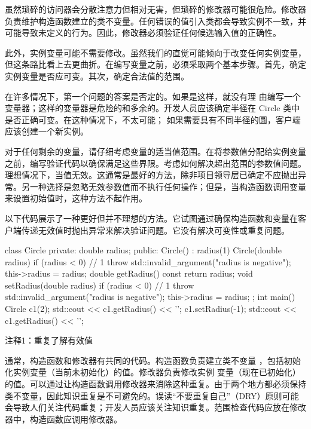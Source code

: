 虽然琐碎的访问器会分散注意力但相对无害，但琐碎的修改器可能很危险。修改器负责维护构造函数建立的类不变量。任何错误的值引入类都会导致实例不一致，并可能导致未定义的行为。因此，修改器必须验证任何候选输入值的正确性。

此外，实例变量可能不需要修改。虽然我们的直觉可能倾向于改变任何实例变量，但这条路比看上去更曲折。在编写变量之前，必须采取两个基本步骤。首先，确定实例变量是否应可变。其次，确定合法值的范围。

在许多情况下，第一个问题的答案是否定的。如果是这样，就没有理 由编写一个变量器；这样的变量器是危险的和多余的。开发人员应该确定半径在 Circle 类中是否正确可变。在这种情况下，不太可能； 如果需要具有不同半径的圆，客户端应该创建一个新实例。

对于任何剩余的变量，请仔细考虑变量的适当值范围。在将参数值分配给实例变量之前，编写验证代码以确保满足这些界限。考虑如何解决超出范围的参数值问题。理想情况下，当值无效。这通常是最好的方法，除非项目领导层已确定不应抛出异常。另一种选择是忽略无效参数值而不执行任何操作；但是，当构造函数调用变量来设置初始值时，这种方法不起作用。


以下代码展示了一种更好但并不理想的方法。它试图通过确保构造函数和变量在客户端传递无效值时抛出异常来解决验证问题。它没有解决可变性或重复问题。


\begin{cpp}
class Circle {
private:
  double radius;
public:
  Circle() : radius(1) {}
  Circle(double radius) {
    if (radius < 0) // 1
      throw std::invalid_argument("radius is negative");
    this->radius = radius;
  }
  double getRadius() const { return radius; }
  void setRadius(double radius) {
    if (radius < 0) // 1
      throw std::invalid_argument("radius is negative");
    this->radius = radius;
  }
};
int main() {
  Circle c1(2);
  std::cout << c1.getRadius() << '\n';
  c1.setRadius(-1);
  std::cout << c1.getRadius() << '\n';
}
\end{cpp}

{\footnotesize
注释1：重复了解有效值
}

通常，构造函数和修改器有共同的代码。构造函数负责建立类不变量 ，包括初始化实例变量（当前未初始化）的值。修改器负责修改实例 变量（现在已初始化）的值。可以通过让构造函数调用修改器来消除这种重复。由于两个地方都必须保持类不变量，因此知识重复是不可避免的。误读“不要重复自己”（DRY）原则可能会导致人们关注代码重复；开发人员应该关注知识重复。范围检查代码应放在修改器中，构造函数应调用修改器。


